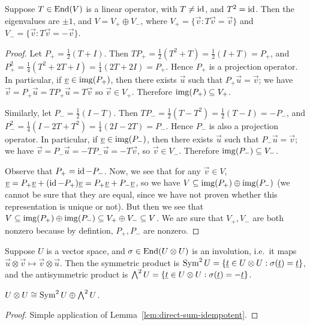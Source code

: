 \begin{lemma}\label{lem:direct-sum-idempotent}
    Suppose \(T \in \operatorname{End}(V)\) is a linear operator,
    with \(T \neq \operatorname{id}\), and \(T^2 = \operatorname{id}\).
    Then the eigenvalues are \(\pm 1\), and \(V = V_+ \oplus V_-\),
    where \(V_+ = \{\vec{v}: T\vec{v} = \vec{v}\}\)
    and \(V_- = \{\vec{v}: T\vec{v} = -\vec{v}\}\).
\end{lemma}
\begin{proof}
    Let \(P_+ = \frac{1}{2}(T+I)\).
    Then \(TP_+ = \frac{1}{2}(T^2+T) = \frac{1}{2}(I+T) = P_+\),
    and \(P_+^2 = \frac{1}{4}(T^2+2T+I) = \frac{1}{4}(2T+2I) = P_+\).
    Hence \(P_+\) is a projection operator.
    In particular, if \(\underline{v} \in \operatorname{img}(P_+)\),
    then there exists \(\vec{u}\) such that \(P_+\vec{u} = \vec{v}\);
    we have \(\vec{v} = P_+\vec{u} = TP_+\vec{u} = T\vec{v}\)
    so \(\vec{v} \in V_+\).
    Therefore \(\operatorname{img}(P_+) \subseteq V_+\).

    Similarly, let \(P_- = \frac{1}{2}(I-T)\).
    Then \(TP_- = \frac{1}{2}(T-T^2) = \frac{1}{2}(T-I) = -P_-\),
    and \(P_-^2 = \frac{1}{4}(I-2T+T^2) = \frac{1}{4}(2I-2T) = P_-\).
    Hence \(P_-\) is also a projection operator.
    In particular, if \(\underline{v} \in \operatorname{img}(P_-)\),
    then there exists \(\vec{u}\) such that \(P_-\vec{u} = \vec{v}\);
    we have \(\vec{v} = P_-\vec{u} = -TP_-\vec{u} = -T\vec{v}\),
    so \(\vec{v} \in V_-\).
    Therefore \(\operatorname{img}(P_-) \subseteq V_-\).

    Observe that \(P_+ = \operatorname{id} - P_-\).
    Now, we see that for any \(\vec{v} \in V\),
    \(\underline{v} = P_+\underline{v} + (\operatorname{id} - P_+)\underline{v} = P_+\underline{v} + P_-\underline{v}\),
    so we have \(V \subseteq \operatorname{img}(P_+) \oplus \operatorname{img}(P_-)\)
    (we cannot be sure that they are equal,
    since we have not proven whether this representation is unique or not).
    But then we see that
    \(V \subseteq \operatorname{img}(P_+) \oplus \operatorname{img}(P_-) \subseteq V_+ \oplus V_- \subseteq V\).
    We are sure that \(V_+,V_-\) are both nonzero
    because by defintion, \(P_+,P_-\) are nonzero.
\end{proof}
\begin{definition}
    Suppose \(U\) is a vector space,
    and \(\sigma \in \operatorname{End}(U \otimes U)\) is an involution,
    i.e.\ it maps \(\vec{u}\otimes\vec{v} \mapsto \vec{v}\otimes\vec{u}\).
    Then the symmetric product is
    \(\operatorname{Sym}^2 U = \{\underline{t} \in U \otimes U: \sigma(\underline{t}) = \underline{t}\}\),
    and the antisymmetric product is
    \(\operatorname{{\bigwedge}}^2 U = \{\underline{t} \in U \otimes U: \sigma(\underline{t}) = -\underline{t}\}\).
\end{definition}
\begin{proposition}\label{prop:sum-sym-wedge}
    \(U \otimes U \cong \operatorname{Sym}^2 U \oplus \operatorname{{\bigwedge}}^2 U\).
\end{proposition}
\begin{proof}
    Simple application of Lemma~\ref*{lem:direct-sum-idempotent}.
\end{proof}

